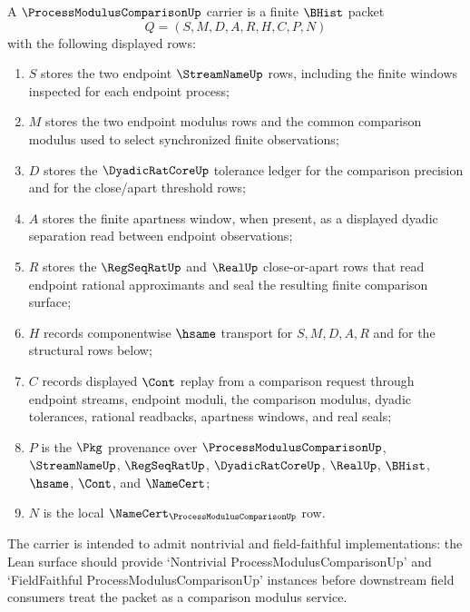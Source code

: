 \begin{definition}
\label{def:process-modulus-comparison-carrier}
A $\ProcessModulusComparisonUp$ carrier is a finite $\BHist$ packet
$$
Q=(S,M,D,A,R,H,C,P,N)
$$
with the following displayed rows:
\begin{enumerate}
\item $S$ stores the two endpoint $\StreamNameUp$ rows, including the finite windows inspected for each endpoint process;
\item $M$ stores the two endpoint modulus rows and the common comparison modulus used to select synchronized finite observations;
\item $D$ stores the $\DyadicRatCoreUp$ tolerance ledger for the comparison precision and for the close/apart threshold rows;
\item $A$ stores the finite apartness window, when present, as a displayed dyadic separation read between endpoint observations;
\item $R$ stores the $\RegSeqRatUp$ and $\RealUp$ close-or-apart rows that read endpoint rational approximants and seal the resulting finite comparison surface;
\item $H$ records componentwise $\hsame$ transport for $S,M,D,A,R$ and for the structural rows below;
\item $C$ records displayed $\Cont$ replay from a comparison request through endpoint streams, endpoint moduli, the comparison modulus, dyadic tolerances, rational readbacks, apartness windows, and real seals;
\item $P$ is the $\Pkg$ provenance over $\ProcessModulusComparisonUp$, $\StreamNameUp$, $\RegSeqRatUp$, $\DyadicRatCoreUp$, $\RealUp$, $\BHist$, $\hsame$, $\Cont$, and $\NameCert$;
\item $N$ is the local $\NameCert_{\ProcessModulusComparisonUp}$ row.
\end{enumerate}
The carrier is intended to admit nontrivial and field-faithful implementations: the Lean surface should provide `Nontrivial ProcessModulusComparisonUp' and `FieldFaithful ProcessModulusComparisonUp' instances before downstream field consumers treat the packet as a comparison modulus service.
\end{definition}

